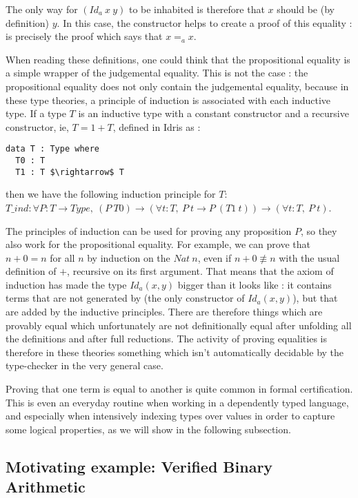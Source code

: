 The only way for $(Id_a\ x\ y)$ to be inhabited is therefore that $x$ should be
(by definition) $y$. In this case, the constructor  helps to create a
proof of this equality :  is precisely the proof which says that
$x=_ax$. 

When reading these definitions, one could think that the propositional equality is a simple wrapper of the judgemental equality. This is not the case : the propositional equality does not only contain the judgemental equality, because in these type theories, a principle of induction is associated with each inductive type. If a type $T$ is an inductive type with a constant constructor and a recursive constructor, ie, $T = 1 + T$, defined in Idris as : 

\begin{lstlisting}
data T : Type where
  T0 : T
  T1 : T $\rightarrow$ T          
\end{lstlisting}

then we have the following induction principle for $T$: \\
$T\_ind : \forall P:T \rightarrow Type,\ (P\ T0) \rightarrow (\forall t:T,\ P\ t \rightarrow P\ (T1\ t)) \rightarrow (\forall t:T,\ P\ t)$.

The principles of induction can be used for proving any proposition $P$, so they also work for the propositional equality. For example, we can prove that $n+0 = n$ for all $n$ by induction on the $Nat\ n$, even if $n+0 \not\equiv n$ with the usual definition of $+$, recursive on its first argument. That means that the axiom of induction has made the type $Id_{a}(x,y)$ bigger than it looks like : it contains terms that are not generated by  (the only constructor of $Id_{a}(x,y)$), but that are added by the inductive principles. There are therefore things which are provably equal which unfortunately are not definitionally equal after unfolding all the definitions and after full reductions. The activity of proving equalities is therefore in these theories something which isn't automatically decidable by the type-checker in the very general case.

Proving that one term is equal to another is quite common
in formal certification. This is even an everyday routine when working in a dependently typed language, and especially when intensively indexing types over values in order to capture some logical properties, as we will show in the following subsection.

\subsection{Motivating example: Verified Binary Arithmetic}
\label{sect:motivatingExample}

